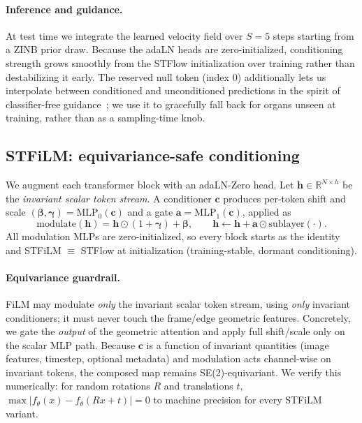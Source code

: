 \documentclass[10pt,twocolumn,letterpaper]{article}
\begin{document}
\paragraph{Inference and guidance.} At test time we integrate the learned velocity field over
$S\!=\!5$ steps starting from a ZINB prior draw. Because the adaLN heads are zero-initialized,
conditioning strength grows smoothly from the STFlow initialization over training rather than
destabilizing it early. The reserved null token (index $0$) additionally lets us interpolate between
conditioned and unconditioned predictions in the spirit of classifier-free guidance~\cite{cfg}; we
use it to gracefully fall back for organs unseen at training, rather than as a sampling-time knob.

\subsection{STFiLM: equivariance-safe conditioning}
We augment each transformer block with an adaLN-Zero head. Let $\mathbf{h}\in\mathbb{R}^{N\times
h}$ be the \emph{invariant scalar token stream}. A conditioner $\mathbf{c}$ produces per-token
shift and scale $(\boldsymbol{\beta},\boldsymbol{\gamma})=\mathrm{MLP}_0(\mathbf{c})$ and a gate
$\mathbf{a}=\mathrm{MLP}_1(\mathbf{c})$, applied as
\begin{equation}
\mathrm{modulate}(\mathbf{h}) = \mathbf{h}\odot(1+\boldsymbol{\gamma}) + \boldsymbol{\beta},
\qquad \mathbf{h} \leftarrow \mathbf{h} + \mathbf{a}\odot \mathrm{sublayer}(\cdot).
\label{eq:modulate}
\end{equation}
All modulation MLPs are zero-initialized, so every block starts as the identity and STFiLM
$\equiv$ STFlow at initialization (training-stable, dormant conditioning).

\paragraph{Equivariance guardrail.}
FiLM may modulate \emph{only} the invariant scalar token stream, using \emph{only} invariant
conditioners; it must never touch the frame/edge geometric features. Concretely, we gate the
\emph{output} of the geometric attention and apply full shift/scale only on the scalar MLP
path. Because $\mathbf{c}$ is a function of invariant quantities (image features, timestep,
optional metadata) and modulation acts channel-wise on invariant tokens, the composed map
remains SE(2)-equivariant. We verify this numerically: for random rotations $R$ and
translations $t$, $\max\lvert f_\theta(x) - f_\theta(Rx+t)\rvert = 0$ to machine precision for
every STFiLM variant.
\end{document}
